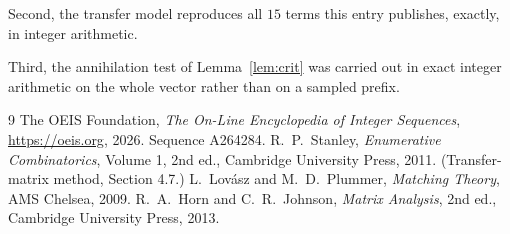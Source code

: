 \documentclass[11pt,a4paper]{article}
\theoremstyle{plain}
\theoremstyle{definition}
\begin{document}
Second, the transfer model reproduces all $15$ terms this entry publishes, exactly, in
integer arithmetic.

Third, the annihilation test of Lemma~\ref{lem:crit} was carried out in exact integer
arithmetic on the whole vector rather than on a sampled prefix.

\begin{thebibliography}{9}
 The OEIS Foundation, \emph{The On-Line Encyclopedia of Integer
Sequences}, \url{https://oeis.org}, 2026. Sequence A264284.
 R.~P.~Stanley, \emph{Enumerative Combinatorics}, Volume 1, 2nd ed.,
Cambridge University Press, 2011. (Transfer-matrix method, Section 4.7.)
 L.~Lov\'asz and M.~D.~Plummer, \emph{Matching Theory}, AMS Chelsea, 2009.
 R.~A.~Horn and C.~R.~Johnson, \emph{Matrix Analysis}, 2nd ed., Cambridge
University Press, 2013.
\end{thebibliography}
\end{document}
